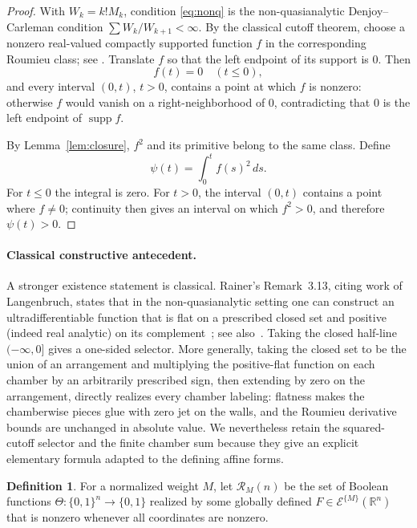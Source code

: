 \documentclass[11pt]{article}
\theoremstyle{definition}
\newtheorem{definition}[theorem]{Definition}
\theoremstyle{remark}
\newcommand{\R}{\mathbb{R}}
\newcommand{\bits}{\{0,1\}}
\begin{document}
\begin{proof}
With $W_k=k!M_k$, condition \eqref{eq:nonq} is the non-quasianalytic Denjoy--Carleman condition $\sum W_k/W_{k+1}<\infty$. By the classical cutoff theorem, choose a nonzero real-valued compactly supported function $f$ in the corresponding Roumieu class; see \cite[Theorem~3.6 and Corollary~3.12]{Rainer2022}. Translate $f$ so that the left endpoint of its support is $0$. Then
\[
 f(t)=0\quad(t\le0),
\]
and every interval $(0,t)$, $t>0$, contains a point at which $f$ is nonzero: otherwise $f$ would vanish on a right-neighborhood of $0$, contradicting that $0$ is the left endpoint of $\operatorname{supp}f$.

By Lemma~\ref{lem:closure}, $f^2$ and its primitive belong to the same class. Define
\[
 \psi(t)=\int_0^t f(s)^2\,ds.
\]
For $t\le0$ the integral is zero. For $t>0$, the interval $(0,t)$ contains a point where $f\ne0$; continuity then gives an interval on which $f^2>0$, and therefore $\psi(t)>0$.
\end{proof}

\paragraph{Classical constructive antecedent.}
A stronger existence statement is classical. Rainer's Remark~3.13, citing work of Langenbruch, states that in the non-quasianalytic setting one can construct an ultradifferentiable function that is flat on a prescribed closed set and positive (indeed real analytic) on its complement~\cite[Remark~3.13]{Rainer2022}; see also~\cite{Langenbruch2003}. Taking the closed half-line $(-\infty,0]$ gives a one-sided selector. More generally, taking the closed set to be the union of an arrangement and multiplying the positive-flat function on each chamber by an arbitrarily prescribed sign, then extending by zero on the arrangement, directly realizes every chamber labeling: flatness makes the chamberwise pieces glue with zero jet on the walls, and the Roumieu derivative bounds are unchanged in absolute value. We nevertheless retain the squared-cutoff selector and the finite chamber sum because they give an explicit elementary formula adapted to the defining affine forms.

\begin{definition}
For a normalized weight $M$, let $\mathcal{R}_M(n)$ be the set of Boolean functions $\Theta:\bits^n\to\bits$ realized by some globally defined $F\in\mathcal{E}^{\{M\}}(\R^n)$ that is nonzero whenever all coordinates are nonzero.
\end{definition}
\end{document}
